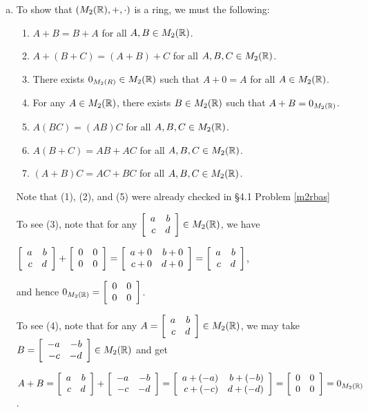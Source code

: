 \documentclass[11pt,fleqn,dvipsnames,usenames]{article}
\begin{document}
\begin{enumerate}[1.]
\solution 
\begin{enumerate}[(a)]
\item To show that $(M_{2}(\R), +, \cdot)$ is a ring, we must the following:
\begin{enumerate}[(1)]
\item $A + B  = B + A$ for all $A,B\in M_{2}(\R)$.
\item $A + (B + C) = (A + B) + C$ for all $A,B,C \in M_{2}(\R)$.
\item There exists $0_{M_{2}(R)}\in M_{2}(\R)$ such that $A + 0 = A$ for all $A\in M_{2}(\R)$.
\item For any $A\in M_{2}(\R)$, there exists $B\in M_{2}(\R)$ such that $A + B = 0_{M_{2}(\R)}$.
\item $A(BC) = (AB)C$ for all $A,B,C \in M_{2}(\R)$.
\item $A(B+C) = AB + AC$ for all $A,B,C \in M_{2}(\R)$.
\item $(A +B)C = AC + BC$ for all $A,B,C \in M_{2}(\R)$.
\end{enumerate}
Note that (1), (2), and (5) were already checked in \S4.1 Problem \ref{m2rbas}
\vsmsp

To see (3), note that for any $\MATRIX{rr}{a & b\\c & d}\in M_{2}(\R)$, we have
\begin{center}
$\MATRIX{rr}{a & b\\c & d} + \MATRIX{rr}{0 & 0\\0 & 0} = \MATRIX{rr}{a + 0 & b + 0\\c + 0 & d + 0} = \MATRIX{rr}{a & b\\c & d}$,
\end{center}
and hence $0_{M_{2}(\R)} = \MATRIX{rr}{0 & 0\\0 & 0}$.

To see (4), note that for any $A = \MATRIX{rr}{a & b\\c & d}\in M_{2}(\R)$, we may take $B = \MATRIX{rr}{-a & -b\\-c & -d}\in M_{2}(\R)$ and get
\begin{center}
$A + B = \MATRIX{rr}{a & b\\c & d} + \MATRIX{rr}{-a & -b\\-c & -d} = \MATRIX{rr}{a + (-a) & b + (-b)\\c + (-c) & d + (-d)} = \MATRIX{rr}{0 & 0\\0 & 0} = 0_{M_{2}(\R)}$.
\end{center}
\end{enumerate}


\end{enumerate}
\end{document}
